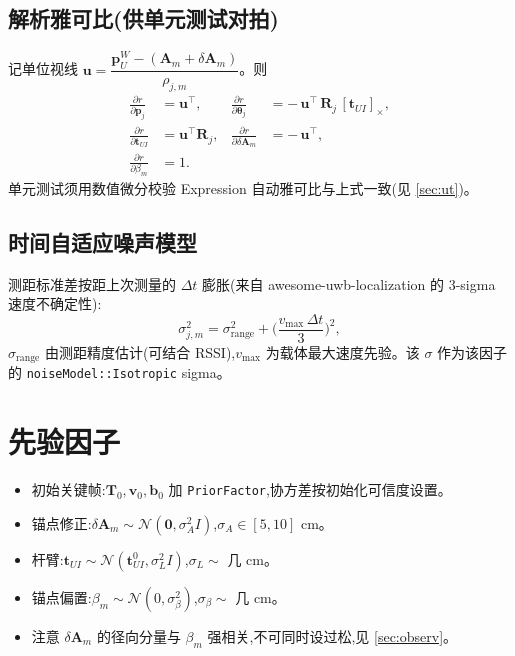 \documentclass[11pt,a4paper]{report}
\newcommand{\bp}{\bm{p}}
\newcommand{\bv}{\bm{v}}
\newcommand{\bb}{\bm{b}}
\newcommand{\bR}{\bm{R}}
\newcommand{\bT}{\bm{T}}
\newcommand{\bA}{\bm{A}}
\newcommand{\bt}{\bm{t}}
\newcommand{\skewop}[1]{\left[#1\right]_{\times}}
\begin{document}
\subsection{解析雅可比(供单元测试对拍)}
记单位视线 $\bm{u}=\dfrac{\bp_U^W-(\bA_m+\delta\bA_m)}{\rho_{j,m}}$。则
\begin{align}
\frac{\partial r}{\partial \bp_j} &= \bm{u}^\top, &
\frac{\partial r}{\partial \bm{\theta}_j} &= -\,\bm{u}^\top\,\bR_j\,\skewop{\bt_{UI}},\\
\frac{\partial r}{\partial \bt_{UI}} &= \bm{u}^\top\bR_j, &
\frac{\partial r}{\partial \delta\bA_m} &= -\,\bm{u}^\top,\\
\frac{\partial r}{\partial \beta_m} &= 1. &&
\end{align}
单元测试须用数值微分校验 Expression 自动雅可比与上式一致(见 \ref{sec:ut})。

\subsection{时间自适应噪声模型}
测距标准差按距上次测量的 $\Delta t$ 膨胀(来自 awesome-uwb-localization 的 3-sigma 速度不确定性):
\begin{equation}
\sigma_{j,m}^2 = \sigma_{\text{range}}^2 + \Big(\frac{v_{\max}\,\Delta t}{3}\Big)^2,
\end{equation}
$\sigma_{\text{range}}$ 由测距精度估计(可结合 RSSI),$v_{\max}$ 为载体最大速度先验。该 $\sigma$ 作为该因子的 \texttt{noiseModel::Isotropic} sigma。

\section{先验因子}
\begin{itemize}[leftmargin=2em]
  \item 初始关键帧:$\bT_0,\bv_0,\bb_0$ 加 \texttt{PriorFactor},协方差按初始化可信度设置。
  \item 锚点修正:$\delta\bA_m\sim\mathcal{N}(\bm{0},\sigma_A^2 I)$,$\sigma_A\in[5,10]$ cm。
  \item 杆臂:$\bt_{UI}\sim\mathcal{N}(\bt_{UI}^0,\sigma_L^2 I)$,$\sigma_L\sim$ 几 cm。
  \item 锚点偏置:$\beta_m\sim\mathcal{N}(0,\sigma_\beta^2)$,$\sigma_\beta\sim$ 几 cm。
  \item 注意 $\delta\bA_m$ 的径向分量与 $\beta_m$ 强相关,不可同时设过松,见 \ref{sec:observ}。
\end{itemize}

\end{document}
